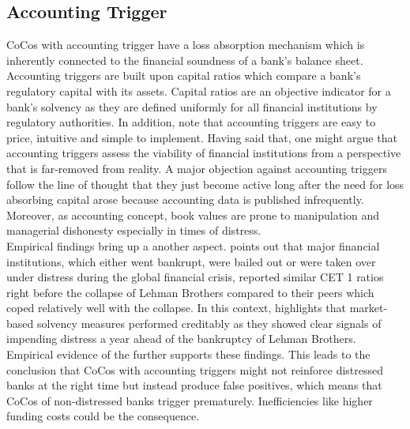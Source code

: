 
\subsection{Accounting Trigger}\label{accountingtrigger}

CoCos with accounting trigger have a loss absorption mechanism which is inherently connected to the financial soundness of a bank's balance sheet. Accounting triggers are built upon capital ratios which compare a bank's regulatory capital with its assets. Capital ratios are an objective indicator for a bank's solvency as they are defined uniformly for all financial institutions by regulatory authorities. \citep{de2014handbook} In addition, \citet{pazarbasioglu2011contingent} note that accounting triggers are easy to price, intuitive and simple to implement. 
Having said that, one might argue that accounting triggers assess the viability of financial institutions from a perspective that is far-removed from reality. A major objection against accounting triggers follow the line of thought that they just become active long after the need for loss absorbing capital arose because accounting data is published infrequently. \citep{de2011pricing} Moreover, as accounting concept, book values are prone to manipulation and managerial dishonesty especially in times of distress. \citep{mcdonald2013contingent}\\ 

Empirical findings bring up a another aspect. \citet{haldane2011capital} points out that major financial institutions, which either went bankrupt, were bailed out or were taken over under distress during the global financial crisis, reported similar CET 1 ratios right before the collapse of Lehman Brothers compared to their peers which coped relatively well with the collapse. In this context, \citet{haldane2011capital} highlights that market-based solvency measures performed creditably as they showed clear signals of impending distress a year ahead of the bankruptcy of Lehman Brothers. Empirical evidence of the  further supports these findings. This leads to the conclusion that CoCos with accounting triggers might not reinforce distressed banks at the right time but instead produce false positives, which means that CoCos of non-distressed banks trigger prematurely. Inefficiencies like higher funding costs could be the consequence. \citep{pazarbasioglu2011contingent}

